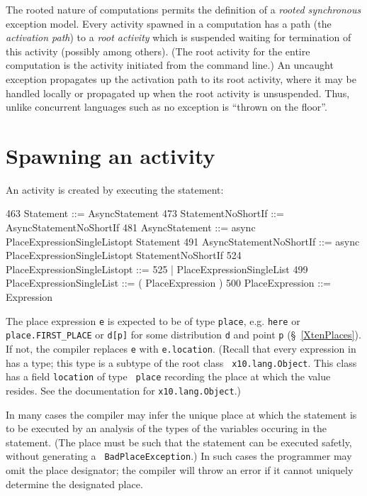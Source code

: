 The rooted nature of \Xten{} computations permits the definition of a
{\em rooted synchronous} exception model.  Every activity spawned in a
computation has a path (the {\em activation path}) to a {\em root
activity} which is suspended waiting for termination of this activity
(possibly among others). (The root activity for the entire computation
is the activity initiated from the command line.) An uncaught
exception propagates up the activation path to its root activity,
where it may be handled locally or propagated up when the root
activity is unsuspended. Thus, unlike concurrent languages such as \java{} no
exception is ``thrown on the floor''.

\section{Spawning an activity}\label{AsynchronousActivity}\label{AsyncActivity}
An activity is created by executing the statement:
\begin{x10}
463 Statement ::= AsyncStatement
473 StatementNoShortIf ::= AsyncStatementNoShortIf
481 AsyncStatement ::= async PlaceExpressionSingleListopt Statement
491 AsyncStatementNoShortIf ::= async PlaceExpressionSingleListopt StatementNoShortIf
524   PlaceExpressionSingleListopt ::=
525                                  | PlaceExpressionSingleList
499   PlaceExpressionSingleList ::= ( PlaceExpression )
500   PlaceExpression ::= Expression
\end{x10} 

The place expression {\tt e} is expected to be of type {\tt place},
e.g.{} {\tt here} or {\tt place.FIRST\_PLACE} or {\tt d[p]} for some
distribution {\tt d} and point {\tt p} (\S~\ref{XtenPlaces}).  
If not, the compiler replaces
{\tt e} with {\tt e.location}. (Recall that every expression in
\Xten{} has a type; this type is a subtype of the root class {\tt
x10.lang.Object}.  This class has a field {\tt location} of type {\tt
place} recording the place at which the value resides. See
the documentation for {\tt x10.lang.Object}.)

In many cases the compiler may infer the unique place at which the
statement is to be executed by an analysis of the types of the
variables occuring in the statement. (The place must be such that the
statement can be executed safetly, without generating a {\tt
BadPlaceException}.) In such cases the programmer may omit the place
designator; the compiler will throw an error if it cannot uniquely
determine the designated place.

